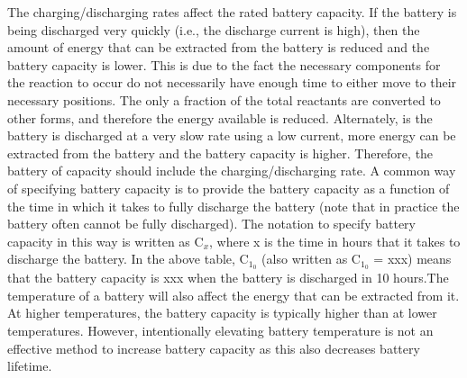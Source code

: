 The charging/discharging rates affect the rated battery capacity. If the battery is being discharged very quickly (i.e., the discharge current is high), then the amount of energy that can be extracted from the battery is reduced and the battery capacity is lower. This is due to the fact the necessary components for the reaction to occur do not necessarily have enough time to either move to their necessary positions. The only a fraction of the total reactants are converted to other forms, and therefore the energy available is reduced. Alternately, is the battery is discharged at a very slow rate using a low current, more energy can be extracted from the battery and the battery capacity is higher. Therefore, the battery of capacity should include the charging/discharging rate. A common way of specifying battery capacity is to provide the battery capacity as a function of the time in which it takes to fully discharge the battery (note that in practice the battery often cannot be fully discharged). The notation to specify battery capacity in this way is written as C$_x$, where x is the time in hours that it takes to discharge the battery. In the above table, C$_1_0$ (also written as C$_1_0$ = xxx) means that the battery capacity is xxx when the battery is discharged in 10 hours.The temperature of a battery will also affect the energy that can be extracted from it. At higher temperatures, the battery capacity is typically higher than at lower temperatures. However, intentionally elevating battery temperature is not an effective method to increase battery capacity as this also decreases battery lifetime. 
